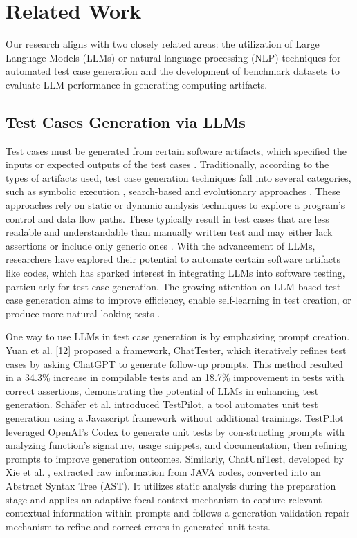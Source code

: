 \section{Related Work}
Our research aligns with two closely related areas: the utilization of Large Language Models (LLMs) or natural language processing (NLP) techniques for automated test case generation and the development of benchmark datasets to evaluate LLM performance in generating computing artifacts. 

\subsection{Test Cases Generation via LLMs}
Test cases must be generated from certain software artifacts, which specified the inputs or expected outputs of the test cases \cite{anand_2013_an}. Traditionally, according to the types of artifacts used, test case generation techniques fall into several categories, such as symbolic execution \cite{anand_2011_heap}, search-based and evolutionary approaches \cite{fraser_2011_evolutionary, fraser_2011_evosuite}. These approaches rely on static or dynamic analysis techniques to explore a program’s control and data flow paths. These typically result in test cases that are less readable and understandable than manually written test \cite{mmoeinalmasi_2017_an} and may either lack assertions or include only generic ones \cite{panichella_2020_replication}. With the advancement of LLMs, researchers have explored their potential to automate certain software artifacts like codes, which has sparked interest in integrating LLMs into software testing, particularly for test case generation. The growing attention on LLM-based test case generation aims to improve efficiency, enable self-learning in test creation, or produce more natural-looking tests \cite{schfer_2023_an}. 

One way to use LLMs in test case generation is by emphasizing prompt creation. Yuan et al. [12] proposed a framework, ChatTester, which iteratively refines test cases by asking ChatGPT to generate follow-up prompts. This method resulted in a 34.3\% increase in compilable tests and an 18.7\% improvement in tests with correct assertions, demonstrating the potential of LLMs in enhancing test generation. Schäfer et al. \cite{schfer_2023_an} introduced TestPilot, a tool automates unit test generation using a Javascript framework without additional trainings. TestPilot leveraged OpenAI's Codex to generate unit tests by con-structing prompts with analyzing function's signature, usage snippets, and documentation, then refining prompts to improve generation outcomes. Similarly, ChatUniTest, developed by Xie et al. \cite{xie_2023_chatunitest} , extracted raw information from JAVA codes, converted into an Abstract Syntax Tree (AST). It utilizes static analysis during the preparation stage and applies an adaptive focal context mechanism to capture relevant contextual information within prompts and follows a generation-validation-repair mechanism to refine and correct errors in generated unit tests.

